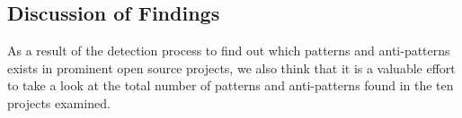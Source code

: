 \documentclass[11pt,a4paper,twocolumn]{article}
\newcommand{\cmark}{\ding{51}}%
\begin{document}

\subsection{Discussion of Findings}
\label{subsec:discussion}

As a result of the detection process to find out which patterns and anti-patterns exists in prominent open source projects, we also think that it is a valuable effort to take a look at the total number of patterns and anti-patterns found in the ten projects examined.
\end{document}
